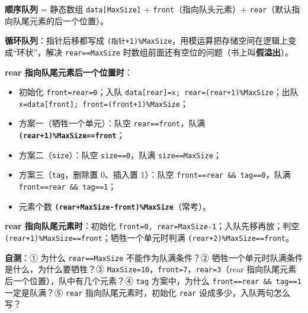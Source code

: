 \documentclass[10.5pt,a4paper,oneside]{article}
\newcommand{\hlred}[1]{\textcolor{wdred}{\bfseries #1}}
\providecommand{\tightlist}{\setlength{\itemsep}{2pt}\setlength{\parskip}{0pt}}
\begin{document}
\begin{summarybox}

\textbf{顺序队列} = 静态数组 \texttt{data{[}MaxSize{]}} +
\texttt{front}（指向队头元素）+
\texttt{rear}（默认指向队尾元素的后一个位置）。

\textbf{循环队列}：指针后移都写成
\texttt{(指针+1)\%MaxSize}，用模运算把存储空间在逻辑上变成“环状”，解决
\texttt{rear==MaxSize}
时数组前面还有空位的问题（书上叫\textbf{假溢出}）。

\textbf{rear 指向队尾元素后一个位置时}：

\begin{itemize}
\tightlist
\item
  初始化 \texttt{front=rear=0}；入队
  \texttt{data{[}rear{]}=x;\ rear=(rear+1)\%MaxSize}；出队
  \texttt{x=data{[}front{]};\ front=(front+1)\%MaxSize}；
\item
  方案一（牺牲一个单元）：队空 \texttt{rear==front}，队满
  \hlred{\texttt{(rear+1)\%MaxSize==front}}；
\item
  方案二（\texttt{size}）：队空 \texttt{size==0}，队满
  \texttt{size==MaxSize}；
\item
  方案三（\texttt{tag}，删除置 0、插入置 1）：队空
  \texttt{front==rear\ \&\&\ tag==0}，队满
  \texttt{front==rear\ \&\&\ tag==1}；
\item
  元素个数 \hlred{\texttt{(rear+MaxSize-front)\%MaxSize}}（常考）。
\end{itemize}

\textbf{rear 指向队尾元素时}：初始化
\texttt{front=0,\ rear=MaxSize-1}；入队先移再放；判空
\texttt{(rear+1)\%MaxSize==front}；牺牲一个单元时判满
\texttt{(rear+2)\%MaxSize==front}。

\textbf{自测}：① 为什么 \texttt{rear==MaxSize} 不能作为队满条件？②
牺牲一个单元时队满条件是什么，为什么要牺牲？③
\texttt{MaxSize=10}，\texttt{front=7}，\texttt{rear=3}（rear
指向队尾元素后一个位置），队中有几个元素？④ \texttt{tag} 方案中，为什么
\texttt{front==rear\ \&\&\ tag==1} 一定是队满？⑤ \texttt{rear}
指向队尾元素时，初始化 \texttt{rear} 设成多少，入队两句怎么写？

\end{summarybox}
\end{document}

